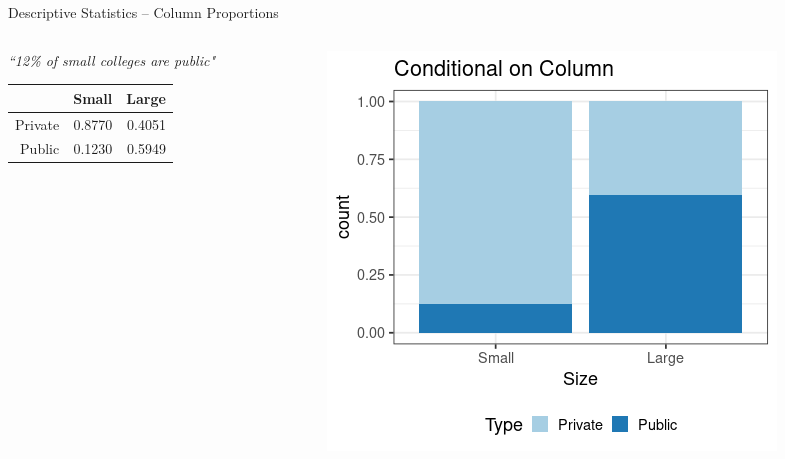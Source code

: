 \documentclass{beamer}
\begin{document}
\begin{frame}{Descriptive Statistics -- Column Proportions}




\begin{columns}

  \begin{column}{0.45\textwidth}
 {\small \textit{``12\% of small colleges are public"}} \vspace{2mm}
\begin{table}[ht]
\centering
\begin{tabular}{rrr}
  \hline
 & Small & Large \\ 
  \hline
Private & 0.8770 & 0.4051 \\ 
  Public & 0.1230 & 0.5949 \\ 
   \hline
\end{tabular}
\end{table}
  \end{column}
  \begin{column}{0.45\textwidth}
\begin{center}
\includegraphics[scale=0.35]{bivariate_col.png}
\end{center}
  \end{column}

\end{columns}

\end{frame}
\end{document}
